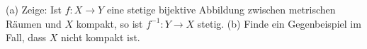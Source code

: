 \begin{prob} 
(a) Zeige: Ist $f:X\to Y$ eine stetige bijektive Abbildung zwischen
metrischen R\"aumen und $X$ kompakt, so ist $f^{-1}:Y\to X$
stetig. 
(b) Finde ein Gegenbeispiel im Fall, dass $X$ nicht kompakt ist. 

\end{prob}
